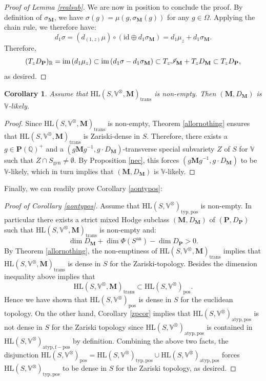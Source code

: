 \documentclass[10pt]{article}
\numberwithin{equation}{subsection}
\theoremstyle{plain}
\newtheorem{corollary}[theorem]{Corollary}
\theoremstyle{definition}
\theoremstyle{remark}
\newcommand{\I}{\mathscr{I}}
\newcommand{\Q}{\mathbb Q}
\newcommand{\R}{\mathbb R}
\newcommand{\V}{\mathbb V}
\newcommand{\pp}{\mathbf P}
\newcommand{\M}{\mathbf M}
\newcommand{\HL}{\mathrm{HL}(S, \V^\otimes)}
\newcommand{\HLM}{\mathrm{HL}(S, \V^\otimes, \M)}
\newcommand{\im}{\mathrm{im} \hspace{0.05cm}}
\newcommand{\id}{\mathrm{id}}
\newcommand{\an}{\mathrm{an}}
\newcommand{\typ}{\mathrm{typ}}
\newcommand{\atyp}{\mathrm{atyp}}
\newcommand{\pos}{\mathrm{pos}}
\newcommand{\trans}{\mathrm{trans}}
\newcommand{\gen}{\mathrm{gen}}
\begin{document}
\begin{proof}[Proof of Lemma \ref{realsub}]
We are now in position to conclude the proof. By definition of $\sigma_\M$, we have $\sigma(g) = \mu(g, \sigma_\M(g))$ for any $g \in \Omega$. Applying the chain rule, we therefore have:
\[
d_1 \sigma = (d_{(1,z)}\mu) \circ (\id \oplus d_1 \sigma_\M) = d_1 \mu_z + d_1 \sigma_\M.
\]
Therefore, 
\[
(T_z D_\pp)_\R = \im(d_1 \mu_z) \subset \im(d_1 \sigma - d_1 \sigma_\M) \subset T_z \I_\M + T_z D_\M \subset T_z D_\pp,
\]
as desired.
\end{proof}
\begin{corollary}\label{necplus}
Assume that $\HLM_\trans$ is non-empty. Then $(\M,D_\M)$ is $\V$-likely.
\end{corollary}
\begin{proof}
Since $\HLM_\trans$ is non-empty, Theorem \ref{allornothing} ensures that $\HLM_\trans$ is Zariski-dense in $S$. Therefore, there exists a $g \in \pp(\Q)^+$ and a $(g \M g^{-1}, g \cdot D_\M)$-transverse special subvariety $Z$ of $S$ for $\V$ such that $Z \cap S_\gen \neq \emptyset$. By Proposition \ref{nec}, this forces $(g \M g^{-1}, g \cdot D_\M)$ to be $\V$-likely, which in turn implies that $(\M,D_\M)$ is $\V$-likely.
\end{proof}
Finally, we can readily prove Corollary \ref{aontypos}:
\begin{proof}[Proof of Corollary \ref{aontypos}]
Assume that $\HL_{\typ, \pos}$ is non-empty. In particular there exists a strict mixed Hodge subclass $(\M, D_\M)$ of $(\pp, D_\pp)$ such that $\HLM_\trans$ is non-empty and:
\[
\dim D_\M + \dim \Phi(S^\an) - \dim D_\pp > 0.
\]
By Theorem \ref{allornothing}, the non-emptiness of $\HLM_\trans$ implies that $\HLM_\trans$ is dense in $S$ for the Zariski-topology. Besides the dimension inequality above implies that \[\HLM_\trans \subset \HL_\pos.\] Hence we have shown that $\HL_\pos$ is dense in $S$ for the euclidean topology. On the other hand, Corollary \ref{zpcor} implies that $\HL_{\atyp, \mathrm{pos}}$ is not dense in $S$ for the Zariski topology since $\HL_{\atyp, \mathrm{pos}}$ is contained in $\HL_{\atyp, \mathrm{f-pos}}$ by definition. Combining the above two facts, the disjunction $\HL_{\mathrm{pos}} = \HL_{\typ,\mathrm{pos}} \cup \HL_{\atyp,\mathrm{pos}}$ forces $\HL_{\typ, \mathrm{pos}}$ to be dense in $S$ for the Zariski topology, as desired.
\end{proof}
\end{document}
